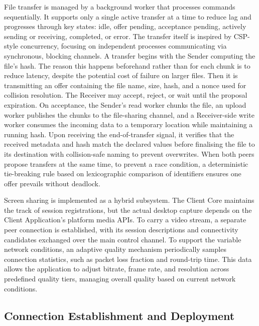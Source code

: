 \documentclass[12pt,a4paper,oneside]{report}
\begin{document}
File transfer is managed by a background worker that processes commands sequentially. It supports only a single active transfer at a time to reduce lag and progresses through key states: idle, offer pending, acceptance pending, actively sending or receiving, completed, or error. The transfer itself is inspired by CSP-style concurrency, focusing on independent processes communicating via synchronous, blocking channels. A transfer begins with the Sender computing the file's hash. The reason this happens beforehand rather than for each chunk is to reduce latency, despite the potential cost of failure on larger files. Then it is transmitting an offer containing the file name, size, hash, and a nonce used for collision resolution. The Receiver may accept, reject, or wait until the proposal expiration. On acceptance, the Sender's read worker chunks the file, an upload worker publishes the chunks to the file-sharing channel, and a Receiver-side write worker consumes the incoming data to a temporary location while maintaining a running hash. Upon receiving the end-of-transfer signal, it verifies that the received metadata and hash match the declared values before finalising the file to its destination with collision-safe naming to prevent overwrites. When both peers propose transfers at the same time, to prevent a race condition, a deterministic tie-breaking rule based on lexicographic comparison of identifiers ensures one offer prevails without deadlock.

Screen sharing is implemented as a hybrid subsystem. The Client Core maintains the track of session registrations, but the actual desktop capture depends on the Client Application's platform media APIs. To carry a video stream, a separate peer connection is established, with its session descriptions and connectivity candidates exchanged over the main control channel. To support the variable network conditions, an adaptive quality mechanism periodically samples connection statistics, such as packet loss fraction and round-trip time. This data allows the application to adjust bitrate, frame rate, and resolution across predefined quality tiers, managing overall quality based on current network conditions.


\subsection{Connection Establishment and Deployment}
\label{sec:deployment}
\end{document}
